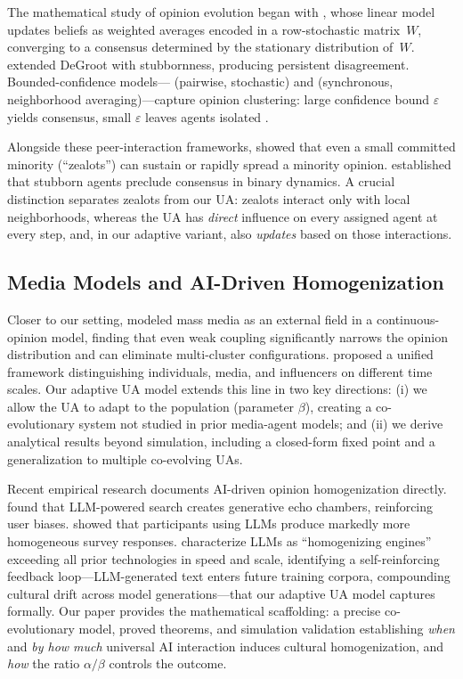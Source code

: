 \documentclass{article}
\theoremstyle{plain}
\theoremstyle{definition}
\theoremstyle{remark}
\begin{document}
The mathematical study of opinion evolution began with
\citet{degroot1974}, whose linear model updates beliefs as weighted
averages encoded in a row-stochastic matrix~$W$, converging to a
consensus determined by the stationary distribution of~$W$.
\citet{friedkin1990} extended DeGroot with stubbornness, producing
persistent disagreement.  Bounded-confidence
models---\citet{deffuant2000} (pairwise, stochastic) and
\citet{hegselmann2002} (synchronous, neighborhood averaging)---capture
opinion clustering: large confidence bound $\varepsilon$ yields
consensus, small $\varepsilon$ leaves agents isolated
\citep{bernardo2024,castellano2009}.

Alongside these peer-interaction frameworks, \citet{mobilia2003,
mobilia2007} showed that even a small committed minority (``zealots'')
can sustain or rapidly spread a minority opinion.
\citet{acemoglu2013binary} established that stubborn agents preclude
consensus in binary dynamics.  A crucial distinction separates zealots
from our UA: zealots interact only with local neighborhoods, whereas
the UA has \emph{direct} influence on every assigned agent at every
step, and, in our adaptive variant, also \emph{updates} based on
those interactions.

\subsection{Media Models and AI-Driven Homogenization}

Closer to our setting, \citet{crokidakis2014} modeled mass media as
an external field in a continuous-opinion model, finding that even
weak coupling significantly narrows the opinion distribution and can
eliminate multi-cluster configurations.  \citet{chica2023} proposed a
unified framework distinguishing individuals, media, and influencers
on different time scales.  Our adaptive UA model extends this line
in two key directions: (i) we allow the UA to adapt to the population
(parameter $\beta$), creating a co-evolutionary system not studied in
prior media-agent models; and (ii) we derive analytical results
beyond simulation, including a closed-form fixed point and a
generalization to multiple co-evolving UAs.

Recent empirical research documents AI-driven opinion homogenization
directly.  \citet{sharma2024} found that LLM-powered search creates
generative echo chambers, reinforcing user biases.
\citet{zhang2025} showed that participants using LLMs produce
markedly more homogeneous survey responses.  \citet{daryani2026}
characterize LLMs as ``homogenizing engines'' exceeding all prior
technologies in speed and scale, identifying a self-reinforcing
feedback loop---LLM-generated text enters future training corpora,
compounding cultural drift across model generations---that our
adaptive UA model captures formally.  Our paper provides the
mathematical scaffolding: a precise co-evolutionary model, proved
theorems, and simulation validation establishing \emph{when} and
\emph{by how much} universal AI interaction induces cultural
homogenization, and \emph{how} the ratio $\alpha/\beta$ controls the
outcome.
\end{document}
